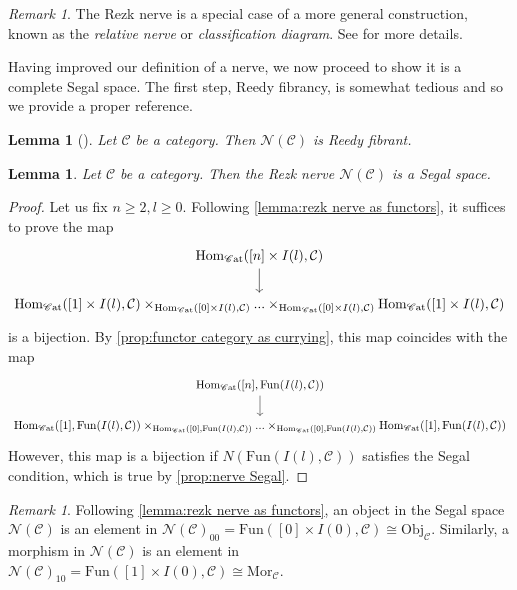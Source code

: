 \documentclass[11pt, a4paper]{amsart}
\newcommand{\cC}{\mathcal{C}}
\newcommand{\sN}{\mathscr{N}}
\newcommand{\Hom}{\mathrm{Hom}}
\newcommand{\Mor}{\mathrm{Mor}}
\newcommand{\Fun}{\mathrm{Fun}}
\newcommand{\Cat}{\mathscr{C}\mathrm{at}}
\newcommand{\Obj}{\mathrm{Obj}}
\newtheorem{lemma}[equation]{Lemma}
\theoremstyle{definition}
\theoremstyle{remark}
\newtheorem{remark}[equation]{Remark}
\numberwithin{equation}{section}
\begin{document}
\begin{remark}
  The Rezk nerve is a special case of a more general construction, known as the \emph{relative nerve} or \emph{classification diagram}. See \cite[Section 3]{rezk2001css} for more details.
\end{remark}

Having improved our definition of a nerve, we now proceed to show it is a complete Segal space. The first step, Reedy fibrancy, is somewhat tedious and so we provide a proper reference.

\begin{lemma}[{\cite[Lemma 3.9]{rezk2001css}}]
 Let $\cC$ be a category. Then $\sN(\cC)$ is Reedy fibrant.
\end{lemma}

\begin{lemma} \label{lemma:rezk nerve segal}
  Let $\cC$ be a category. Then the Rezk nerve $\sN(\cC)$ is a Segal space.
\end{lemma}

\begin{proof}
 Let us fix $n \geq 2, l \geq 0$. Following \cref{lemma:rezk nerve as functors}, it suffices to prove the map 
 \[
  \begin{tikzcd}
   \Hom_{\Cat}([n] \times I(l),\cC) \arrow[d] \\ \Hom_{\Cat}([1] \times I(l),\cC) \times_{\Hom_{\Cat}([0] \times I(l),\cC)} ... \times_{\Hom_{\Cat}([0] \times I(l),\cC)} \Hom_{\Cat}([1] \times I(l),\cC)
  \end{tikzcd} 
 \]
 is a bijection. By \cref{prop:functor category as currying}, this map coincides with the map 
 {\small
 \[
 \begin{tikzcd}
  \Hom_{\Cat}([n], \Fun (I(l),\cC)) \arrow[d] \\ \Hom_{\Cat}([1], \Fun(I(l),\cC)) \times_{\Hom_{\Cat}([0], \Fun(I(l),\cC))} ... \times_{\Hom_{\Cat}([0], \Fun(I(l),\cC))} \Hom_{\Cat}([1], \Fun(I(l),\cC))
 \end{tikzcd} 
 \]}
 However, this map is a bijection if $N(\Fun(I(l),\cC))$ satisfies the Segal condition, which is true by \cref{prop:nerve Segal}.
\end{proof}

\begin{remark} \label{rem:objects morphisms rezk nerve}
  Following \cref{lemma:rezk nerve as functors}, an object in the Segal space $\sN(\cC)$ is an element in $\sN(\cC)_{00} = \Fun([0] \times I(0),\cC) \cong \Obj_{\cC}$. Similarly, a morphism in $\sN(\cC)$ is an element in $\sN(\cC)_{10} = \Fun([1] \times I(0),\cC) \cong \Mor_{\cC}$.
\end{remark}
\end{document}
